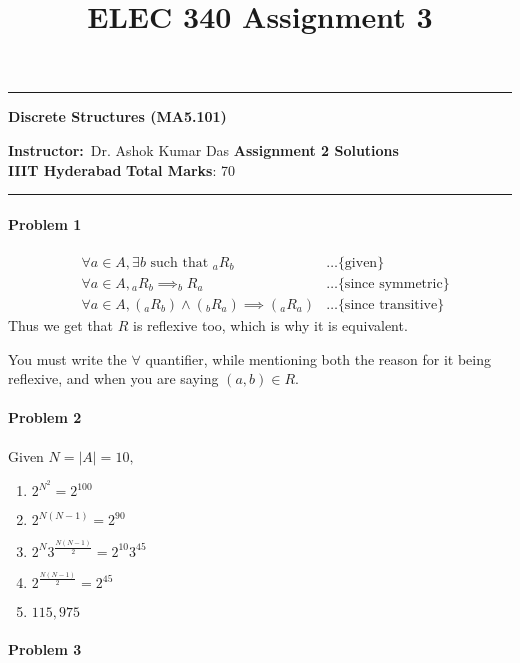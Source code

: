 \documentclass[12pt]{scrartcl}
\title{ELEC 340 Assignment 3}
\begin{document}
\begin{center}
\specialrule{0.02em}{}{}
\hrule
\vspace{0.3cm}
	{\textbf { \large {Discrete Structures (MA5.101) }}} 
\end{center}
\textbf{Instructor:}\ Dr. Ashok Kumar Das \hspace{\fill}\textbf{Assignment 2 Solutions}    \\
{\textbf{IIIT Hyderabad}   } \hspace{\fill} \textbf{Total Marks}: 70 \\ 
\specialrule{0.01em}{}{}
\hrule

\paragraph*{Problem 1 } 
     \begin{align*}
           & \forall a \in A,  \exists b \text{ such that } {}_aR_b & \ldots \text{\{given\}}
           \\ &\forall a \in A, {}_aR_b \implies _bR_a & \ldots \text{\{since symmetric\}}
           \\ & \forall a \in A, ({}_aR_b) \land ({}_bR_a) \implies (_aR_a)  & \ldots \text{\{since transitive\}} 
     \end{align*}
     Thus we get that $R$ is reflexive too, which is why it is equivalent.
     
     You must write the $\forall$ quantifier, while mentioning both the reason for it being reflexive, and when you are saying $(a,b) \in R$.
\paragraph*{Problem 2}
Given $N = |A| = 10,$
\begin{enumerate}
    \item $2^{N^2} = 2^{100}$
    \item $2^{N(N - 1)} = 2^{90}$
    \item $2^{N}3^{\frac{N(N - 1)}{2}} = 2^{10}3^{45}$
    \item $2^{\frac{N(N - 1)}{2}} = 2^{45}$
    \item $115,975$
\end{enumerate}

\paragraph*{Problem 3}
\end{document}
